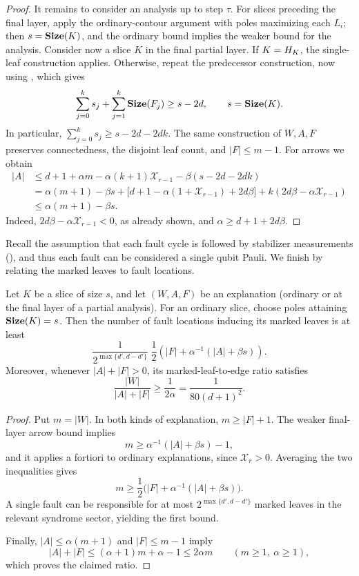 \begin{proof}
  It remains to consider an analysis up to step $\tau$. For slices
  preceding the final layer, apply the ordinary-contour argument with
  poles maximizing each $L_i$; then $s=\mathbf{Size}(K)$, and the ordinary
  bound implies the weaker bound for the analysis. Consider now a slice
  $K$ in the final partial layer.
  If $K=H_{K}$, the single-leaf construction applies. Otherwise,
  repeat the predecessor construction, now using
  , which gives
  \[
    \sum_{j=0}^k s_j+\sum_{j=1}^k\mathbf{Size}(F_j)
       \geq s-2d,
    \qquad s=\mathbf{Size}(K).
  \]
  In particular, $\sum_{j=0}^k s_j\geq s-2d-2dk$.
  The same construction of $W,A,F$ preserves connectedness,
  the disjoint leaf count, and $|F|\leq m-1$. For arrows we obtain
  \begin{align*}
    |A|
    &\leq d+1+\alpha m-\alpha(k+1)\mathcal{X}_{r-1}
                         -\beta(s-2d-2dk)\\
    &=\alpha(m+1)-\beta s
      +\bigl[d+1-\alpha(1+\mathcal{X}_{r-1})+2d\beta\bigr]
      +k(2d\beta-\alpha\mathcal{X}_{r-1})\\
    &\leq\alpha(m+1)-\beta s.
  \end{align*}
  Indeed, $2d\beta-\alpha\mathcal{X}_{r-1}<0$, as already shown,
  and $\alpha\geq d+1+2d\beta$.
\end{proof}

Recall the assumption that each fault cycle is followed by stabilizer measurements (), and thus each fault can be considered a single qubit Pauli. We finish by relating the marked leaves to fault locations.

\begin{corollary}
  \label{coro:edgefaultratio}
  Let $K$ be a slice of size $s$, and let $(W,A,F)$ be an explanation
  (ordinary or at the final layer of a partial analysis). For an ordinary
  slice, choose poles attaining $\mathbf{Size}(K)=s$. Then the
  number of fault locations inducing its marked leaves is at least
  \begin{equation*}
    \frac{1}{2^{\max\{d',d-d'\}}}\;\frac12
    \left(|F|+\alpha^{-1}(|A|+\beta s)\right).
  \end{equation*}
  Moreover, whenever $|A|+|F|>0$, its marked-leaf-to-edge ratio
  satisfies
  \begin{equation*}
    \frac{|W|}{|A|+|F|}\geq\frac{1}{2\alpha}
      =\frac{1}{80(d+1)^2}.
  \end{equation*}
\end{corollary}
\begin{proof}
  Put $m=|W|$. In both kinds of explanation,
  $m\geq |F|+1$. The weaker final-layer arrow bound implies
  \[
    m\geq\alpha^{-1}(|A|+\beta s)-1,
  \]
  and it applies a fortiori to ordinary explanations, since
  $\mathcal{X}_r>0$. Averaging the two inequalities gives
  \[
    m\geq\frac12\bigl(|F|+\alpha^{-1}(|A|+\beta s)\bigr).
  \]
  A single fault can be responsible for at most
  $2^{\max\{d',d-d'\}}$ marked leaves in the relevant syndrome
  sector, yielding the first bound.

  Finally,
  $|A|\leq\alpha(m+1)$ and $|F|\leq m-1$ imply
  \[
    |A|+|F|\leq(\alpha+1)m+\alpha-1\leq 2\alpha m
    \qquad(m\geq1,\ \alpha\geq1),
  \]
  which proves the claimed ratio.
\end{proof} 
